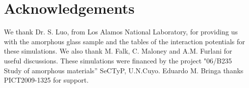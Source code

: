 \section{Acknowledgements}
We thank Dr. S. Luo, from Los Alamos National Laboratory, for providing us with the amorphous glass sample and the tables of the interaction potentials for these simulations. We also thank M. Falk, C. Maloney and A.M. Furlani for useful discussions. These simulations were financed by the project "06/B235 Study of amorphous materials” SeCTyP, U.N.Cuyo. Eduardo M. Bringa thanks PICT2009-1325 for support.